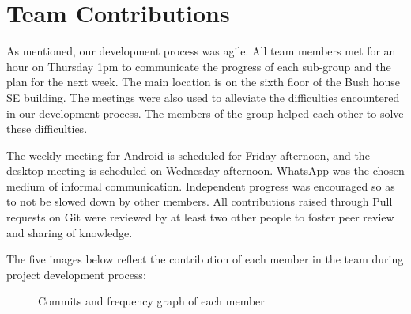 \section{Team Contributions}

As mentioned, our development process was agile. All team members met for an hour on Thursday 1pm to communicate the progress of each sub-group and the plan for the next week. The main location is on the sixth floor of the Bush house SE building.   The meetings were also used to alleviate the difficulties encountered in our development process. The members of the group helped each other to solve these difficulties.\newline

The weekly meeting for Android is scheduled for Friday afternoon, and the desktop meeting is scheduled on Wednesday afternoon. WhatsApp was the chosen medium of informal communication. Independent progress was encouraged so as to not be slowed down by other members. All contributions raised through Pull requests on Git were reviewed by at least two other people to foster peer review and sharing of knowledge.\newline

The five images below reflect the contribution of each member in the team during project development process:\newline


\begin{figure}
\centering



\end{figure}

\begin{figure}
\centering



\caption{Commits and frequency graph of each member}

\end{figure}

